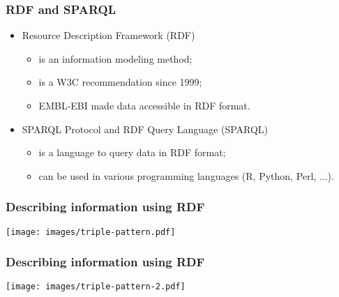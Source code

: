 \documentclass[11pt,aspectratio=169]{beamer} %
\begin{document}
\begin{frame}
  \frametitle{RDF and SPARQL}
  \begin{itemize}
    \item Resource Description Framework (RDF)
      \begin{itemize}
        \item is an information modeling method;
        \item is a W3C recommendation since 1999;
        \item EMBL-EBI made data accessible in RDF format.
        \end{itemize}
    \item SPARQL Protocol and RDF Query Language (SPARQL)
      \begin{itemize}
        \item is a language to query data in RDF format;
        \item can be used in various programming languages (R, Python, Perl, ...).
      \end{itemize}
  \end{itemize}
\end{frame}



\begin{frame}
  \frametitle{Describing information using RDF}
  \begin{center}
    \texttt{[image: images/triple-pattern.pdf]}
  \end{center}
\end{frame}

\begin{frame}
  \frametitle{Describing information using RDF}
  \begin{center}
    \texttt{[image: images/triple-pattern-2.pdf]}
  \end{center}
\end{frame}
\end{document}
